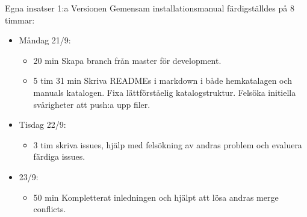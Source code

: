 \documentclass{TDP003mall}
\begin{document}
Egna insatser 1:a Versionen Gemensam installationsmanual färdigställdes på 8 timmar:
\begin{itemize}
	\item Måndag 21/9:
	\begin{itemize}
		\item 20 min Skapa branch från master för development.
		\item 5 tim 31 min Skriva READMEs i markdown i både hemkatalagen och manuals katalogen. Fixa lättförståelig katalogstruktur. Felsöka initiella svårigheter att push:a upp filer.
	\end{itemize}
	\item Tisdag 22/9:
	\begin{itemize}
                \item 3 tim skriva issues, hjälp med felsökning av andras problem och evaluera färdiga issues.
        \end{itemize}
        \item 23/9:
        \begin{itemize}
                \item 50 min Kompletterat inledningen och hjälpt att lösa andras merge conflicts.\\
	\end{itemize}
\end{itemize}
\end{document}
